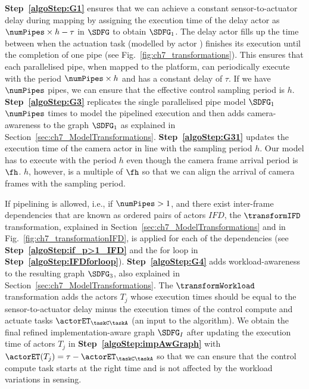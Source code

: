 \textbf{Step~\ref{algoStep:G1}} ensures that we can achieve a constant sensor-to-actuator delay during mapping by assigning the execution time of the delay actor as $\numPipes\times h - \tau$ in $\SDFG$ to obtain $\SDFG_{1}$.
The delay actor fills up the time between when the actuation task (modelled by actor \taskA) finishes its execution until the completion of one pipe (see Fig.~\ref{fig:ch7_transformations}).
This ensures that each parallelised pipe, when mapped to the platform, can periodically execute with the period $\numPipes\times h$ and has a constant delay of $\tau$.
If we have $\numPipes$ pipes, we can ensure that the effective control sampling period is $h$.
\textbf{Step~\ref{algoStep:G3}} replicates the single parallelised pipe model $\SDFG_{1}$ $\numPipes$ times to model the pipelined execution and then adds camera-awareness to the graph $\SDFG_{1}$ as explained in Section~\ref{sec:ch7_ModelTransformations}.
\textbf{Step~\ref{algoStep:G31}} updates the execution time of the camera actor in line with the sampling period $h$.
Our model has to execute with the period $h$ even though the camera frame arrival period is $\fh$.
$h$, however, is a multiple of $\fh$ so that we can align the arrival of camera frames with the sampling period.

If pipelining is allowed, i.e., if $\numPipes>1$, and there exist inter-frame dependencies that are known as ordered pairs of actors $\mathit{IFD}$, the $\transformIFD$ transformation, explained in Section~\ref{sec:ch7_ModelTransformations} and in Fig.~\ref{fig:ch7_transformationIFD}, is applied for each of the dependencies (see \textbf{Step~\ref{algoStep:if_p>1_IFD}} and the for loop in \textbf{Step~\ref{algoStep:IFDforloop}}).
\textbf{Step~\ref{algoStep:G4}} adds workload-awareness to the resulting graph $\SDFG_{3}$, also explained in Section~\ref{sec:ch7_ModelTransformations}.
The $\transformWorkload$ transformation adds the actors $T_j$ whose execution times should be equal to the sensor-to-actuator delay minus the execution times of the control compute and actuate tasks $\actorET_{{\taskC}{\taskA}}$ (an input to the algorithm).
We obtain the final refined implementation-aware graph $\SDFG_{I}$ after updating the execution time of actors $T_j$ in \textbf{Step~\ref{algoStep:impAwGraph}} with $\actorET(T_j)=\tau-\actorET_{{\taskC}{\taskA}}$ so that we can ensure that the control compute task starts at the right time and is not affected by the workload variations in sensing.

